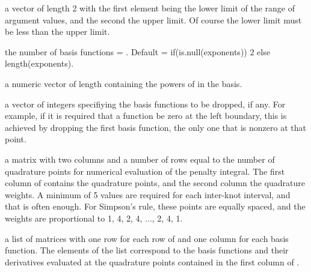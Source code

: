 \begin{Arguments}
\begin{ldescription}
\item[\code{rangeval}] a vector of length 2 with the first element being the lower limit of
the range of argument values, and the second the upper limit.  Of
course the lower limit must be less than the upper limit.

\item[\code{nbasis}] the number of basis functions = .  Default =
if(is.null(exponents)) 2 else length(exponents).

\item[\code{exponents}] a numeric vector of length  containing the powers of
 in the basis.

\item[\code{dropind}] a vector of integers specifiying the basis functions to be dropped,
if any.  For example, if it is required that a function be zero at
the left boundary, this is achieved by dropping the first basis
function, the only one that is nonzero at that point.

\item[\code{quadvals}] a matrix with two columns and a number of rows equal to the number
of quadrature points for numerical evaluation of the penalty
integral.  The first column of  contains the
quadrature points, and the second column the quadrature weights.  A
minimum of 5 values are required for each inter-knot interval, and
that is often enough.  For Simpson's rule, these points are equally
spaced, and the weights are proportional to 1, 4, 2, 4, ..., 2, 4,
1.

\item[\code{values}] a list of matrices with one row for each row of  and
one column for each basis function.  The elements of the list
correspond to the basis functions and their derivatives evaluated at
the quadrature points contained in the first column of
.


\end{ldescription}
\end{Arguments}
